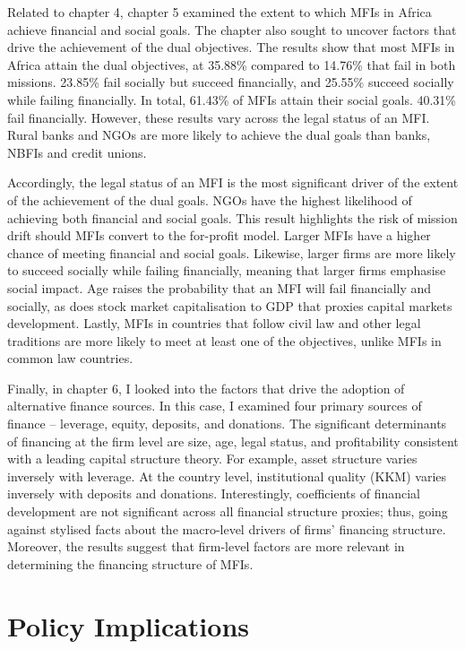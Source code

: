 \documentclass[a4paper, nobind]{templates/ociamthesis}
\begin{document}
Related to chapter 4, chapter 5 examined the extent to which MFIs in Africa achieve financial and social goals. The chapter also sought to uncover factors that drive the achievement of the dual objectives. The results show that most MFIs in Africa attain the dual objectives, at 35.88\% compared to 14.76\% that fail in both missions. 23.85\% fail socially but succeed financially, and 25.55\% succeed socially while failing financially. In total, 61.43\% of MFIs attain their social goals. 40.31\% fail financially. However, these results vary across the legal status of an MFI. Rural banks and NGOs are more likely to achieve the dual goals than banks, NBFIs and credit unions.

Accordingly, the legal status of an MFI is the most significant driver of the extent of the achievement of the dual goals. NGOs have the highest likelihood of achieving both financial and social goals. This result highlights the risk of mission drift should MFIs convert to the for-profit model. Larger MFIs have a higher chance of meeting financial and social goals. Likewise, larger firms are more likely to succeed socially while failing financially, meaning that larger firms emphasise social impact. Age raises the probability that an MFI will fail financially and socially, as does stock market capitalisation to GDP that proxies capital markets development. Lastly, MFIs in countries that follow civil law and other legal traditions are more likely to meet at least one of the objectives, unlike MFIs in common law countries.

Finally, in chapter 6, I looked into the factors that drive the adoption of alternative finance sources. In this case, I examined four primary sources of finance -- leverage, equity, deposits, and donations. The significant determinants of financing at the firm level are size, age, legal status, and profitability consistent with a leading capital structure theory. For example, asset structure varies inversely with leverage. At the country level, institutional quality (KKM) varies inversely with deposits and donations. Interestingly, coefficients of financial development are not significant across all financial structure proxies; thus, going against stylised facts about the macro-level drivers of firms' financing structure. Moreover, the results suggest that firm-level factors are more relevant in determining the financing structure of MFIs.

\hypertarget{policy-implications}{%
\section{Policy Implications}\label{policy-implications}}
\end{document}

